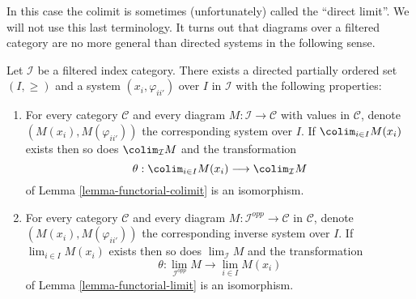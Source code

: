 \noindent
In this case the colimit is sometimes (unfortunately)
called the ``direct limit''. We will not use this last
terminology. It turns out that diagrams over a filtered
category are no more general than directed systems in the
following sense.

\begin{lemma}
\label{lemma-directed-category-system}
Let $\mathcal{I}$ be a filtered index category.
There exists a directed partially ordered set $(I, \geq)$
and a system $(x_i, \varphi_{ii'})$ over $I$ in $\mathcal{I}$
with the following properties:
\begin{enumerate}
\item For every category $\mathcal{C}$ and every diagram
$M : \mathcal{I} \to \mathcal{C}$ with values in $\mathcal{C}$,
denote $(M(x_i), M(\varphi_{ii'}))$
the corresponding system over $I$. If
$\colim_{i \in I} M(x_i)$ exists then so does
$\colim_\mathcal{I} M$ and the transformation
$$
\theta :
\colim_{i \in I} M(x_i)
\longrightarrow
\colim_\mathcal{I} M
$$
of Lemma \ref{lemma-functorial-colimit} is an isomorphism.
\item For every category $\mathcal{C}$ and every diagram
$M : \mathcal{I}^{opp} \to \mathcal{C}$ in $\mathcal{C}$, denote
$(M(x_i), M(\varphi_{ii'}))$ the corresponding inverse system
over $I$. If $\lim_{i \in I} M(x_i)$ exists then so does
$\lim_\mathcal{I} M$ and the transformation
$$
\theta :
\lim_{\mathcal{I}^{opp}} M
\longrightarrow
\lim_{i \in I} M(x_i)
$$
of Lemma \ref{lemma-functorial-limit} is an isomorphism.
\end{enumerate}
\end{lemma}

